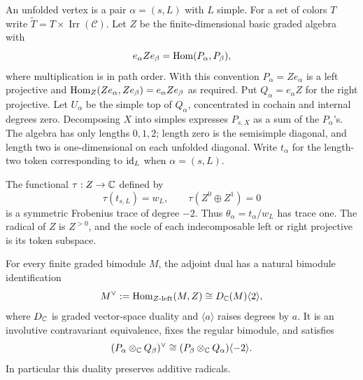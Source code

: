 An unfolded vertex is a pair $\alpha=(s,L)$ with $L$ simple. For a set
of colors $T$ write $\widetilde T=T\times\operatorname{Irr}(\mathscr C)$.
Let $Z$ be the finite-dimensional basic graded algebra with
\begin{equation}
 e_\alpha Z e_\beta=\operatorname{Hom}(P_\alpha,P_\beta),
 \label{eq:category-path-order}
\end{equation}
where multiplication is in path order. With this convention
$P_\alpha=Ze_\alpha$ is a left projective and
$\operatorname{Hom}_Z(Ze_\alpha,Ze_\beta)=e_\alpha Ze_\beta$ as required. Put
$Q_\alpha=e_\alpha Z$ for the right projective.
Let $U_\alpha$ be the simple top of $Q_\alpha$, concentrated in
cochain and internal degrees zero. Decomposing $X$ into
simples expresses $P_{s,X}$ as a sum of the $P_\alpha$'s. The algebra
has only lengths $0,1,2$; length zero is the semisimple diagonal, and
length two is one-dimensional on each unfolded diagonal. Write
$t_\alpha$ for the length-two token corresponding to $\operatorname{id}_L$ when
$\alpha=(s,L)$.

\begin{lemma}
\label{lem:category-frobenius}
The functional $\tau:Z\to\mathbb C$ defined by
\[
 \tau(t_{s,L})=w_L,
 \qquad \tau(Z^0\oplus Z^1)=0
\]
is a symmetric Frobenius trace of degree $-2$. Thus
$\theta_\alpha=t_\alpha/w_L$ has trace one. The radical of $Z$ is
$Z^{>0}$, and the socle of each indecomposable left or right projective
is its token subspace.

For every finite graded bimodule $M$, the adjoint dual has a natural
bimodule identification
\begin{equation}
 M^\vee:=\operatorname{Hom}_{Z\text{-left}}(M,Z)
       \cong D_\mathbb C(M)\langle2\rangle,
 \label{eq:category-adjoint-duality}
\end{equation}
where $D_\mathbb C$ is graded vector-space duality and $\langle a\rangle$
raises degrees by $a$. It is an involutive contravariant equivalence,
fixes the regular bimodule, and satisfies
\begin{equation}
 (P_\alpha\otimes_\mathbb C Q_\beta)^\vee
       \cong(P_\beta\otimes_\mathbb C Q_\alpha)\langle-2\rangle.
 \label{eq:category-projective-dual}
\end{equation}
In particular this duality preserves additive radicals.
\end{lemma}

